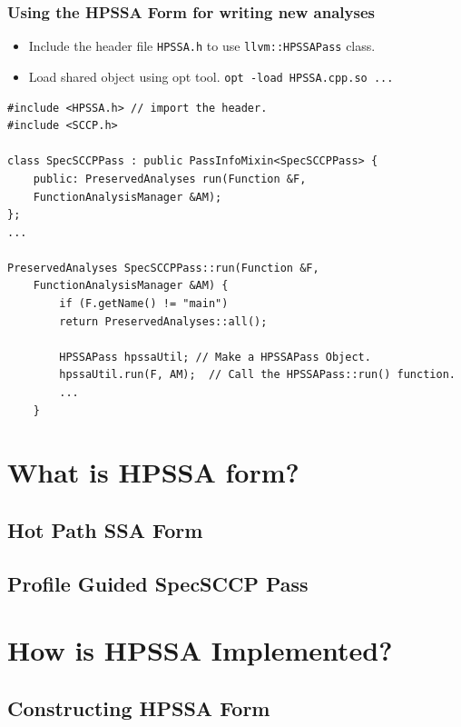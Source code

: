 \documentclass[aspectratio=169, compress]{beamer}
\begin{document}
\begin{frame}[fragile]
	\frametitle{Using the HPSSA Form for writing new analyses}
	\begin{itemize}
		\item Include the header file \texttt{HPSSA.h} to use  \texttt{llvm::HPSSAPass} class.
		\item Load shared object using opt tool. \texttt{opt -load HPSSA.cpp.so ...} 
	\end{itemize}
	\begin{verbatim}
#include <HPSSA.h> // import the header.
#include <SCCP.h>

class SpecSCCPPass : public PassInfoMixin<SpecSCCPPass> {
	public: PreservedAnalyses run(Function &F, 
	FunctionAnalysisManager &AM);
};
...

PreservedAnalyses SpecSCCPPass::run(Function &F, 
	FunctionAnalysisManager &AM) {
		if (F.getName() != "main")
		return PreservedAnalyses::all();
		
		HPSSAPass hpssaUtil; // Make a HPSSAPass Object.
		hpssaUtil.run(F, AM);  // Call the HPSSAPass::run() function.
		...
	}
	\end{verbatim}
\end{frame}
\section{What is HPSSA form?}
\subsection{Hot Path SSA Form}
{
	
}
\subsection{Profile Guided SpecSCCP Pass}
{
	
}
\footnotesize

\section{How is HPSSA Implemented?}
\subsection{Constructing HPSSA Form}
{
	
}
{
	
}
\end{document}
